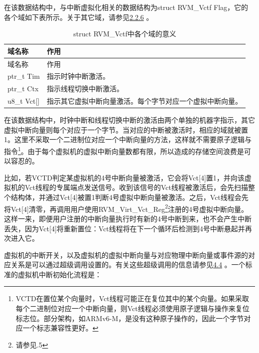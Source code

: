 在该数据结构中，与中断虚拟化相关的数据结构为struct RVM\_Vctf Flag，它的各个域如下表所示。关于其它域，请参见\protect\hyperref[subsec:2-2-6]{2.2.6}
。

\begin{xltabular}{\textwidth}{@{}>{\hsize\raggedright\arraybackslash}X>{\hsize\raggedright\arraybackslash}X@{}}
\caption{struct RVM\_\allowbreak{}Vctf中各个域的意义}\label{tab:2-4}\\
\toprule
域名称 & 作用\tabularnewline
\endfirsthead
\toprule
域名称 & 作用\tabularnewline
\midrule
\endhead
\bottomrule
\endlastfoot
ptr\_\allowbreak{}t Tim & 指示时钟中断激活。\tabularnewline
ptr\_\allowbreak{}t Ctx & 指示线程切换中断激活。\tabularnewline
u8\_\allowbreak{}t Vct{[}{]} &
指示其它虚拟中断向量激活。每个字节对应一个虚拟中断向量。\tabularnewline
\end{xltabular}

在该数据结构中，时钟中断和线程切换中断的激活由两个单独的机器字指示，其它虚拟中断向量则每个对应于一个字节。当对应的中断被激活时，相应的域就被置1。这里不采取一个二进制位对应一个中断向量的方法，这样就不需要原子逻辑与指令\footnote{VCTD在置位某个向量时，Vct线程可能正在复位其中的某个向量。如果采取每个二进制位对应一个中断向量，则Vct线程必须使用原子逻辑与操作来复位标志位。部分架构，如ARMv6-M，是没有这种原子操作的，因此一个字节对应一个标志兼容性更好。}。由于每个虚拟机的虚拟中断向量数都有限，所以造成的存储空间浪费是可以容忍的。

比如，若VCTD判定某虚拟机的4号中断向量被激活，它会将Vct{[}4{]}置1，并向该虚拟机的Vct线程的专属端点发送信号。收到该信号的Vct线程被激活后，会先扫描整个结构体，并通过Vct{[}4{]}被置1判断4号虚拟中断向量被激活。之后，Vct线程会先将Vct{[}4{]}清零，再调用用户使用RVM\_Virt\_Vct\_Reg\footnote{请参见.5}注册的4号虚拟中断向量。这样一来，即便用户注册的中断向量执行时有新的4号中断到来，也不会产生中断丢失，因为Vct{[}4{]}将重新置位：Vct线程将在下一个循环后检测到4号中断悬起并再次进入它。

虚拟机的中断开关，以及虚拟机的虚拟中断向量与对应物理中断向量或事件源的对应关系是可以通过超级调用设置的。有关这些超级调用的信息请参见\protect\hyperref[sec:4-4]{4.4}
。一个标准的虚拟机中断初始化流程是：

